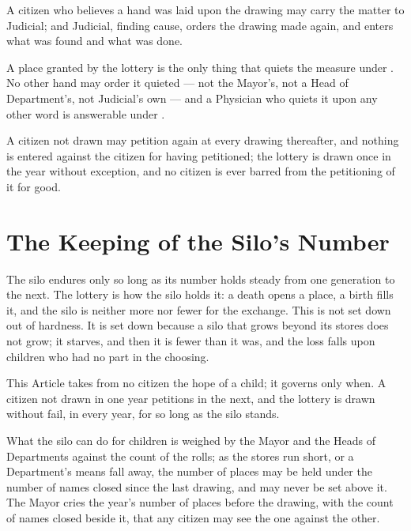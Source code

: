 \begin{clauses}
\item A citizen who believes a hand was laid upon the drawing may carry the matter to Judicial; and Judicial, finding cause, orders the drawing made again, and enters what was found and what was done.
\item A place granted by the lottery is the only thing that quiets the measure under . No other hand may order it quieted --- not the Mayor's, not a Head of Department's, not Judicial's own --- and a Physician who quiets it upon any other word is answerable under .
\item A citizen not drawn may petition again at every drawing thereafter, and nothing is entered against the citizen for having petitioned; the lottery is drawn once in the year without exception, and no citizen is ever barred from the petitioning of it for good.
\end{clauses}

\section{The Keeping of the Silo's Number}
\label{sec:marriage:keeping-of-the-silos-number}

The silo endures only so long as its number holds steady from one generation to the next. The lottery is how the silo holds it: a death opens a place, a birth fills it, and the silo is neither more nor fewer for the exchange. This is not set down out of hardness. It is set down because a silo that grows beyond its stores does not grow; it starves, and then it is fewer than it was, and the loss falls upon children who had no part in the choosing.

\begin{clauses}
\item This Article takes from no citizen the hope of a child; it governs only when. A citizen not drawn in one year petitions in the next, and the lottery is drawn without fail, in every year, for so long as the silo stands.
\item What the silo can do for children is weighed by the Mayor and the Heads of Departments against the count of the rolls; as the stores run short, or a Department's means fall away, the number of places may be held under the number of names closed since the last drawing, and may never be set above it. The Mayor cries the year's number of places before the drawing, with the count of names closed beside it, that any citizen may see the one against the other.
\end{clauses}

